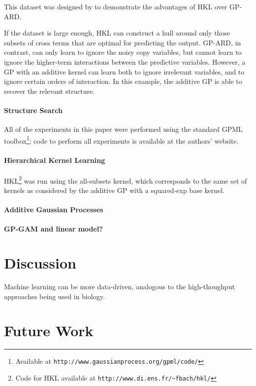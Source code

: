 \documentclass[twoside]{article}
\begin{document}
This dataset was designed by \cite{DBLP:journals/corr/abs-0909-0844} to demonstrate the advantages of HKL over GP-ARD. 

If the dataset is large enough, HKL can construct a hull around only those subsets of cross terms that are optimal for predicting the output.  GP-ARD, in contrast, can only learn to ignore the noisy copy variables, but cannot learn to ignore the higher-term interactions between the predictive variables.  However, a GP with an additive kernel can learn both to ignore irrelevant variables, and to ignore certain orders of interaction.  In this example, the additive GP is able to recover the relevant structure.

\paragraph{Structure Search}
All of the experiments in this paper were performed using the standard GPML toolbox\footnote{Available at \texttt{http://www.gaussianprocess.org/gpml/code/}}; code to perform all experiments is available at the authors' website.

\paragraph{Hierarchical Kernel Learning}	
HKL\footnote{Code for HKL available at \texttt{http://www.di.ens.fr/\textasciitilde fbach/hkl/}} was run using the all-subsets kernel, which corresponds to the same set of kernels as considered by the additive GP with a squared-exp base kernel.

\paragraph{Additive Gaussian Processes} \cite{duvenaud2011additive11}

\paragraph{GP-GAM and linear model?}

\section{Discussion}

Machine learning can be more data-driven, analogous to the high-thoughput approaches being used in biology. 

\section{Future Work}
\end{document}
